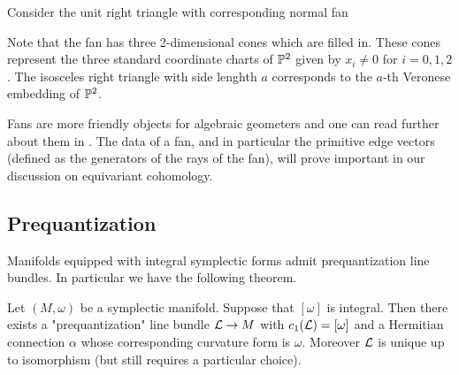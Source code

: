 \begin{example}
    Consider the unit right triangle with corresponding normal fan
    \begin{center}
    \end{center} 
    Note that the fan has three 2-dimensional cones which are filled in.
    These cones represent the three standard coordinate charts of $\P^2$ given by
    $x_i \neq 0$ for $i = 0,1,2$. The isosceles right triangle with
    side lenghth $a$ corresponds to the $a$-th Veronese 
    embedding of $\P^2$.
\end{example}
Fans are more friendly objects for algebraic geometers and 
one can read further about them in \cite{cls}. The data of a fan,
and in particular the primitive edge vectors (defined as the generators of the rays of the fan),
will prove important in our discussion on equivariant cohomology.

\subsection{Prequantization}
Manifolds equipped with integral symplectic forms admit prequantization line bundles.
In particular we have the following theorem. 

\begin{theorem}
    Let $(M,\omega)$ be a symplectic manifold. Suppose that $[\omega]$ is integral. Then 
    there exists a "prequantization" line bundle $\cL \to M$ with $c_1(\cL) = [\omega]$ and a Hermitian connection $\alpha$
    whose corresponding curvature form is $\omega$. Moreover $\cL$ is unique up to isomorphism 
    (but still requires a particular choice). 
\end{theorem}

